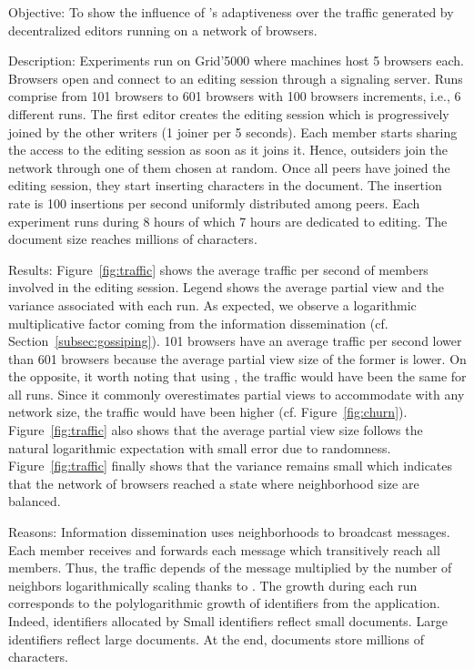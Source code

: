 \begin{asparadesc}
\item [Objective:] To show the influence of \SPRAY's adaptiveness over the
  traffic generated by decentralized editors running on a network of browsers.
\item [Description:] Experiments run on Grid'5000 where machines host 5 browsers
  each. Browsers open \CRATE and connect to an editing session through a
  signaling server.  Runs comprise from 101 browsers to 601 browsers with 100
  browsers increments, i.e., 6 different runs.  The first editor creates the
  editing session which is progressively joined by the other writers (1 joiner
  per 5 seconds). Each member starts sharing the access to the editing session
  as soon as it joins it. Hence, outsiders join the network through one of them
  chosen at random. Once all peers have joined the editing session, they start
  inserting characters in the document. The insertion rate is 100 insertions per
  second uniformly distributed among peers. Each experiment runs during 8 hours
  of which 7 hours are dedicated to editing. The document size reaches millions
  of characters.
\item [Results:] Figure~\ref{fig:traffic} shows the average traffic per second
  of members involved in the editing session. Legend shows the average partial
  view and the variance associated with each run. As expected, we observe a
  logarithmic multiplicative factor coming from the information dissemination
  (cf. Section~\ref{subsec:gossiping}). 101 browsers have an average traffic per
  second lower than 601 browsers because the average partial view size of the
  former is lower.  On the opposite, it worth noting that using \CYCLON, the
  traffic would have been the same for all runs. Since it commonly overestimates
  partial views to accommodate with any network size, the traffic would have
  been higher (cf. Figure~\ref{fig:churn}).  Figure~\ref{fig:traffic} also shows
  that the average partial view size follows the natural logarithmic expectation
  with small error due to randomness. Figure~\ref{fig:traffic} finally shows
  that the variance remains small which indicates that the network of browsers
  reached a state where neighborhood size are balanced.
\item [Reasons:] Information dissemination uses neighborhoods to broadcast
  messages. Each member receives and forwards each message which transitively
  reach all members. Thus, the traffic depends of the message multiplied by the
  number of neighbors logarithmically scaling thanks to \SPRAY. The growth
  during each run corresponds to the polylogarithmic growth of identifiers from
  the application. Indeed, identifiers allocated by   Small
  identifiers reflect small documents. Large identifiers reflect large
  documents. At the end, documents store millions of characters.
\end{asparadesc}
